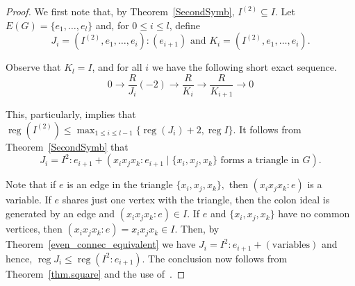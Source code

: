 \documentclass[ALCO,ThmDefs,Unicode,epreuves]{cedram}
\DeclareMathOperator{\reg}{reg}
\newcommand*{\reg}{\mathrm{reg}}
\begin{document}
\begin{proof}
We first note that, by Theorem~\ref{SecondSymb}, $I^{(2)} \subseteq I$. Let $E(G)=\{e_1,\ldots, e_l\}$ and, for $0 \le i \le l$, define 
\[
J_i=(I^{(2)}, e_1, \ldots ,e_i):(e_{i+1}) \text{ and } K_i=(I^{(2)} , e_1, \ldots, e_i).
\]


Observe that $K_l = I$, and for all $i$ we have the following short exact sequence.
\begin{equation}
0 \longrightarrow \frac{R}{J_i} (-2) \longrightarrow \frac{R}{K_i} \longrightarrow \frac{R}{K_{i+1}} \longrightarrow 0
\end{equation}

This, particularly, implies that $\displaystyle \reg (I^{(2)}) \leq \max_{1\leq i \leq l-1 }\{\reg (J_i)+2, \reg I\}.$ It follows from Theorem~\ref{SecondSymb} that 
\[
J_i= I^2:e_{i+1}+ (x_ix_jx_k:e_{i+1}  \mid  \{x_i,x_j,x_k\} \text{ forms a triangle in } G).
\]
 
Note that if $e$ is an edge in the triangle $\{x_i,x_j,x_k\},$ then $(x_ix_jx_k:e)$ is a variable. If $e$ shares just one vertex with the triangle, then the colon ideal is generated by an edge and $(x_ix_jx_k:e) \in I.$ If $e$ and $\{x_i,x_j,x_k\}$ have no common vertices, then $(x_ix_jx_k:e) = x_ix_jx_k \in I.$ Then, by Theorem~\ref{even_connec_equivalent} we have $J_i= I^2:e_{i+1}+ (\text{variables})$ and hence, $\reg J_i \le \reg (I^2:e_{i+1})$. The conclusion now follows from Theorem~\ref{thm.square} and the use of~\cite[Proposition 4.9]{CHHKTT}.
\end{proof}



 


\nocite{*}


\end{document}
